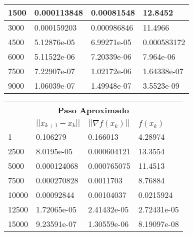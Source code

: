 \documentclass{article}
\begin{document}
\begin{enumerate}
\begin{table}[ht]
{\begin{tabular}{llll}
  \multicolumn{1}{|l|}{1500}  & \multicolumn{1}{l|}{0.000113848}  & \multicolumn{1}{l|}{0.00081548} & \multicolumn{1}{l|}{12.8452} \\ \hline
  \multicolumn{1}{|l|}{3000}  & \multicolumn{1}{l|}{0.000159203}  & \multicolumn{1}{l|}{0.000986846}  & \multicolumn{1}{l|}{11.4966} \\ \hline
  \multicolumn{1}{|l|}{4500}  & \multicolumn{1}{l|}{5.12876e-05}  & \multicolumn{1}{l|}{6.99271e-05}  & \multicolumn{1}{l|}{0.000583172} \\ \hline
  \multicolumn{1}{|l|}{6000}  & \multicolumn{1}{l|}{5.11522e-06}  & \multicolumn{1}{l|}{7.20339e-06}  & \multicolumn{1}{l|}{7.964e-06} \\ \hline
  \multicolumn{1}{|l|}{7500}  & \multicolumn{1}{l|}{7.22907e-07}  & \multicolumn{1}{l|}{1.02172e-06}  & \multicolumn{1}{l|}{1.64338e-07} \\ \hline
  \multicolumn{1}{|l|}{9000}  & \multicolumn{1}{l|}{1.06039e-07}  & \multicolumn{1}{l|}{1.49948e-07}  & \multicolumn{1}{l|}{3.5523e-09} \\ \hline
  \end{tabular}
  \begin{tabular}{llll}
  \multicolumn{4}{c}{Paso Aproximado} \\ \hline
  \rowcolor[HTML]{DBDBDB} 
  \multicolumn{1}{|l|}{\cellcolor[HTML]{DBDBDB}k} & \multicolumn{1}{l|}{\cellcolor[HTML]{DBDBDB}$||x_{k+1} - x_k||$} & \multicolumn{1}{l|}{\cellcolor[HTML]{DBDBDB}$||\nabla f (x_k )||$}       & \multicolumn{1}{l|}{\cellcolor[HTML]{DBDBDB}$f(x_k)$} \\ \hline
  \multicolumn{1}{|l|}{1} & \multicolumn{1}{l|}{0.106279} & \multicolumn{1}{l|}{0.166013} &\multicolumn{1}{l|}{4.28974} \\ \hline
  \multicolumn{1}{|l|}{2500}  & \multicolumn{1}{l|}{8.0195e-05} & \multicolumn{1}{l|}{0.000604121}  & \multicolumn{1}{l|}{13.3554} \\ \hline
  \multicolumn{1}{|l|}{5000}  & \multicolumn{1}{l|}{0.000124068}  & \multicolumn{1}{l|}{0.000765075}  & \multicolumn{1}{l|}{11.4513} \\ \hline
  \multicolumn{1}{|l|}{7500}  & \multicolumn{1}{l|}{0.000270828}  & \multicolumn{1}{l|}{0.0011703}  & \multicolumn{1}{l|}{8.76884} \\ \hline
  \multicolumn{1}{|l|}{10000} & \multicolumn{1}{l|}{0.00092844} & \multicolumn{1}{l|}{0.00104037} & \multicolumn{1}{l|}{0.0215924} \\ \hline
  \multicolumn{1}{|l|}{12500} & \multicolumn{1}{l|}{1.72065e-05}  & \multicolumn{1}{l|}{2.41432e-05}  & \multicolumn{1}{l|}{2.72431e-05} \\ \hline
  \multicolumn{1}{|l|}{15000} & \multicolumn{1}{l|}{9.23591e-07}  & \multicolumn{1}{l|}{1.30559e-06}  & \multicolumn{1}{l|}{8.19097e-08} \\ \hline
  \end{tabular}
}
\end{table}


\end{enumerate}
\end{document}
